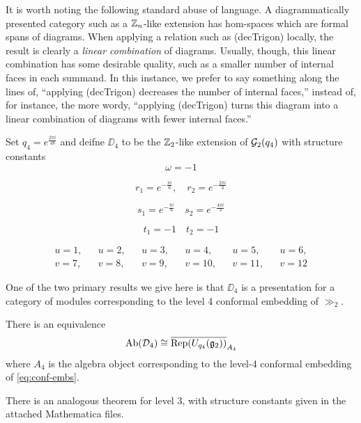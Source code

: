 \begin{remark}
    It is worth noting the following standard abuse of language. 
    A diagrammatically presented category such as a $\mathbb{Z}_n$-like extension has hom-spaces which are formal spans of diagrams.
    When applying a relation such as (decTrigon) locally, the result is clearly a {\it linear combination} of diagrams.
    Usually, though, this linear combination has some desirable quality, such as a smaller number of internal faces in each summand.
    In this instance, we prefer to say something along the lines of, 
    ``applying (decTrigon) decreases the number of internal faces,''
    instead of, for instance, the more wordy,
    ``applying (decTrigon) turns this diagram into a linear combination of diagrams with fewer internal faces.''
\end{remark}



\begin{definition}
    Set $q_4 = e^{\frac{2\pi i}{48}}$ and deifne $\DD_4$ to be the $\mathbb{Z}_2$-like extension of $\mathcal{G}_2(q_4)$ with structure constants
    \begin{equation*}
    \omega = -1
    \end{equation*}

    \begin{equation*}
        r_1 = e^{-\frac{\pi i}{6}}, \quad r_2 = e^{-\frac{2\pi i}{3}}
    \end{equation*}

    \begin{equation*}
        s_1 = e^{-\frac{\pi i}{6}} \quad s_2 = e^{-\frac{4\pi i}{3}}
    \end{equation*}

    \begin{equation*}
        t_1 = -1 \quad t_2 = -1
    \end{equation*}

    \begin{align*}
        u = 1, && u = 2, && u = 3, && u = 4, && u = 5, && u = 6, \\
        v = 7, && v = 8, && v = 9, && v = 10, && v = 11, && v = 12 
    \end{align*}


\end{definition}



One of the two primary results we give here is that $\DD_4$ is a presentation for a category of modules corresponding to the
level 4 conformal embedding of $\gg_2$.
\begin{theorem}
    There is an equivalence
    \[
        \operatorname{Ab}(\mathcal{D}_4) \cong \overline{\operatorname{Rep}(U_{q_4}(\mathfrak{g}_2))}_{A_4}
    \]
    where $A_4$ is the algebra object corresponding to the level-4 conformal embedding of \ref{eq:conf-embs}.
\end{theorem}
There is an analogous theorem for level 3, with structure constants given in the attached Mathematica files.

